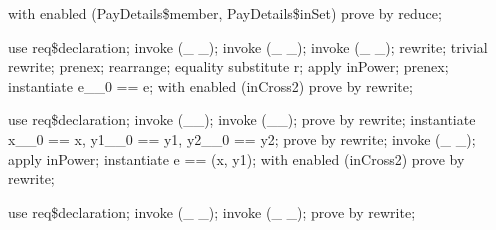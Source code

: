 \begin{LPScript}\begin{zproof}[fPayDetailsMember]
    with enabled (PayDetails\$member, PayDetails\$inSet) prove by reduce;
\end{zproof}\end{LPScript}

\begin{LPScript}\begin{zproof}[gMESSAGEReqRelType]
    use req\$declaration;
    invoke (\_ \fun \_);
    invoke (\_ \pfun \_);
    invoke (\_ \rel \_);
    rewrite;
    trivial rewrite;
    prenex;
    rearrange;
    equality substitute r;
    apply inPower;
    prenex;
    instantiate e\_\_0 == e;
    with enabled (inCross2) prove by rewrite;
\end{zproof}\end{LPScript}

\begin{LPScript}\begin{zproof}[gMESSAGEReqPFunType]
    use req\$declaration;
    invoke (\_\fun \_);
    invoke (\_\pfun \_);
    prove by rewrite;
    instantiate x\_\_0 == x, y1\_\_0 == y1, y2\_\_0 == y2;
    prove by rewrite;
    invoke (\_ \rel \_);
    apply inPower;
    instantiate e == (x, y1);
    with enabled (inCross2) prove by rewrite;
\end{zproof}\end{LPScript}

\begin{LPScript}\begin{zproof}[gMESSAGEReqPayDetailsRelType]
    use req\$declaration;
    invoke (\_ \fun \_);
    invoke (\_ \pfun \_);
    prove by rewrite;
\end{zproof}\end{LPScript}

